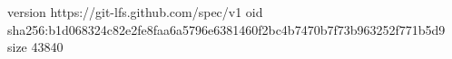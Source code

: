 version https://git-lfs.github.com/spec/v1
oid sha256:b1d068324c82e2fe8faa6a5796e6381460f2bc4b7470b7f73b963252f771b5d9
size 43840
